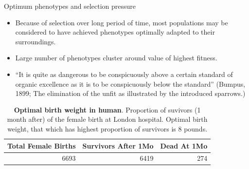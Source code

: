 \documentclass[11pt,dvipsnames,ignorenonframetext,aspectratio=169]{beamer}
\providecommand{\tightlist}{%
  \setlength{\itemsep}{0pt}\setlength{\parskip}{0pt}}
\begin{document}
\begin{frame}{Optimum phenotypes and selection pressure}
\protect\hypertarget{optimum-phenotypes-and-selection-pressure}{}
\begin{itemize}
\tightlist
\item
  Because of selection over long period of time, most populations may be
  considered to have achieved phenotypes optimally adapted to their
  surroundings.
\item
  Large number of phenotypes cluster around value of highest fitness.
\item
  ``It is quite as dangerous to be conspicuously above a certain
  standard of organic excellence as it is to be conspicuously below the
  standard'' (Bumpus, 1899; The elimination of the unfit as illustrated
  by the introduced sparrows.)
\end{itemize}

\begin{table}

\caption{\label{tab:optimal-birth-weight-human}\textbf{Optimal birth weight in human}. Proportion of suvivors (1 month after) of the female birth at London hospital. Optimal birth weight, that which has highest proportion of survivors is 8 pounds.}
\centering
\fontsize{8}{10}\selectfont
\begin{tabular}[t]{rrr}
\toprule
Total Female Births & Survivors After 1Mo & Dead At 1Mo\\
\midrule
6693 & 6419 & 274\\
\bottomrule
\end{tabular}
\end{table}
\end{frame}
\end{document}
